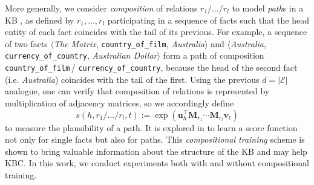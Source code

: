 \documentclass[11pt,a4paper]{article}
\newcommand{\mat}[1]{\bm{#1}}
\renewcommand{\vec}[1]{\bm{#1}}
\newcommand{\setofents}{\mathcal{E}}
\begin{document}
More generally, we consider \emph{composition} of 
relations $r_1/\ldots/r_l$ to model \emph{path}s in a 
KB \citep{guu-miller-liang:2015:EMNLP}, as defined by 
$r_1,\ldots,r_l$ participating in a 
sequence of facts such that the head entity of 
each fact coincides with the tail of its previous. 
For example, a sequence of two facts 
$\langle$\textit{The Matrix}, \texttt{country\_of\_film}, 
\textit{Australia}$\rangle$ and $\langle$\textit{Australia}, \texttt{currency\_of\_country}, \textit{Australian Dollar}$\rangle$ form a path of composition \texttt{country\_of\_film}\,/ \texttt{currency\_of\_country}, 
because the head of the second 
fact (i.e. \textit{Australia}) coincides with the tail of the first. 
Using the previous $d=\lvert\setofents\rvert$ analogue, one can verify 
that composition of 
relations is represented by multiplication of adjacency matrices, 
so we accordingly define 
$$
s(h,r_1/\ldots/r_l,t):=\exp(\vec{u}_h^\top\mat{M}_{r_1}\cdots\mat{M}_{r_l}\vec{v}_t)
$$
to measure the plausibility of a path. It is explored in 
\citet{guu-miller-liang:2015:EMNLP} to learn a score function not only for 
single facts but also for paths. This \emph{compositional training} scheme 
is shown to bring valuable information about the 
structure of the KB and may help KBC. In this work, we conduct experiments both with and 
without compositional training. 




\end{document}
